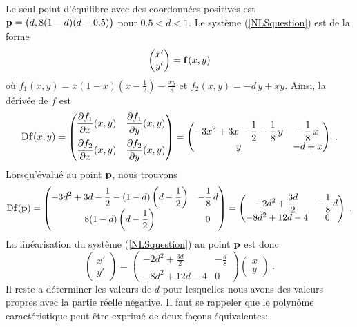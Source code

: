 { Le seul point d'équilibre avec des coordonnées positives est
$\mathbf{p} = \big(d, 8(1-d)(d-0.5) \big)$ pour $0.5<d<1$.
Le système (\ref{NLSquestion}) est de la forme
\[
  \begin{pmatrix}
   x ' \\ y'
  \end{pmatrix} = \mathbf{f}(x,y)
\]
où $\displaystyle f_1(x,y) = x(1-x)\left(x-\frac{1}{2}\right) - \frac{xy}{8}$
et $f_2(x,y) = -d\,y + xy$.  Ainsi, la dérivée de $f$ est
\[
\mathrm{D} \mathbf{f}(x,y) =
\begin{pmatrix}
\displaystyle \frac{\partial f_1}{\partial x}(x,y) & \displaystyle \frac{\partial f_1}{\partial y}(x,y) \\[1em]
\displaystyle \frac{\partial f_2}{\partial x}(x,y) & \displaystyle \frac{\partial f_2}{\partial y}(x,y)
\end{pmatrix}
= \begin{pmatrix}
\displaystyle -3x^2 + 3x - \frac{1}{2} - \frac{1}{8}\,y &
\displaystyle  -\frac{1}{8}\,x \\
y & -d+ x
\end{pmatrix} \ .
\]
Lorsqu'évalué au point $\mathbf{p}$, nous trouvons
\[
\mathrm{D} \mathbf{f}(\mathbf{p}) =
\begin{pmatrix}
\displaystyle -3d^2 + 3d - \frac{1}{2} - (1-d)\left(d-\frac{1}{2}\right) &
\displaystyle  -\frac{1}{8}\,d \\
\displaystyle 8(1-d)\left(d-\frac{1}{2}\right) & 0
\end{pmatrix}
= \begin{pmatrix}
\displaystyle -2d^2 + \frac{3d}{2}& \displaystyle -\frac{1}{8}\,d \\
-8d^2 +12d -4 & 0
\end{pmatrix} \ .
\]
La linéarisation du système (\ref{NLSquestion}) au point $\mathbf{p}$ est donc
\[
  \begin{pmatrix} x' \\ y' \end{pmatrix} =
  \begin{pmatrix}
\displaystyle -2d^2 +\frac{3 d}{2} & \displaystyle -\frac{d}{8} \\
-8d^2 +12d -4 & 0 \end{pmatrix}
\begin{pmatrix}
x \\ y
\end{pmatrix} \ .
\]
Il reste a déterminer les valeurs de $d$ pour lesquelles nous avons
des valeurs propres avec la partie réelle négative.  Il faut se
rappeler que le polynôme caractéristique peut être exprimé de deux
façons équivalentes:
\begin{align*}

\end{align*}}
